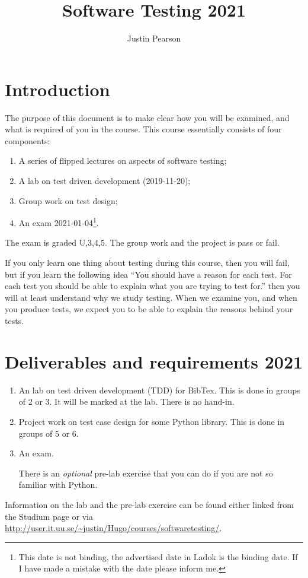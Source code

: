 \documentclass[a4paper]{article}
\title{Software Testing 2021}
\author{Justin Pearson }
\begin{document}
\maketitle
\def\UrlBreaks{\do\/\do-} 

\section{Introduction}
The purpose of this document is to make clear how you will be examined, and
what is required of you in the course.  This course essentially consists of
four components:
\begin{enumerate}
\item A series of flipped lectures on aspects of software testing;
 \item A lab on test driven development (2019-11-20);
\item Group work on test design;
\item An exam 2021-01-04\footnote{This date is not binding, the
    advertised date in Ladok is the binding date. If I have made a
    mistake with the date please inform me.}. 
\end{enumerate}
The exam is graded U,3,4,5. The group work and the project is pass or fail.

If you only learn one thing about testing during this course, then you
will fail, but if you learn the following idea ``You should have a
reason for each test. For each test you should be able to explain what
you are trying to test for.'' then you will at least understand why we
study testing. When we examine you, and when you produce tests, we
expect you to be able to explain the reasons behind your tests.


\section{Deliverables and requirements  2021}



\begin{enumerate}
\item An lab on  test driven development (TDD) for  BibTex.   This is
  done in groups of 2 or 3. It will be marked at the lab. There is no
  hand-in. 
\item Project work on test case design for some Python library. This
  is done in groups of 5 or 6.
\item An exam.

There is an {\em optional} pre-lab exercise that you can do if you are
not so familiar with Python.  


  
  
  \end{enumerate}
  Information on the lab and the pre-lab exercise can be found either
  linked from the Studium page or via
  \url{http://user.it.uu.se/~justin/Hugo/courses/softwaretesting/}.
\end{document}

